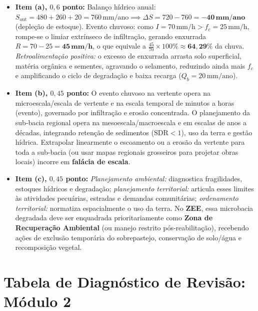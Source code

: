 \begin{boxGabarito}
  \begin{itemize}[leftmargin=1.5em, itemsep=3pt]
    \item \textbf{Item (a), $0{,}6$ ponto:}
    Balanço hídrico anual: $S_{\text{out}} = 480 + 260 + 20 = 760\,\text{mm/ano} \implies \Delta S = 720 - 760 = \mathbf{-40\,\text{mm/ano}}$ (depleção de estoque).
    Evento chuvoso: como $I = 70\,\text{mm/h} > f_c = 25\,\text{mm/h}$, rompe-se o limiar extrínseco de infiltração, gerando enxurrada $R = 70 - 25 = \mathbf{45\,\text{mm/h}}$, o que equivale a $\frac{45}{70} \times 100\% \approx \mathbf{64{,}29\%}$ da chuva.
    \emph{Retroalimentação positiva:} o excesso de enxurrada arrasta solo superficial, matéria orgânica e sementes, agravando o selamento, reduzindo ainda mais $f_c$ e amplificando o ciclo de degradação e baixa recarga ($Q_b = 20\,\text{mm/ano}$).
    \item \textbf{Item (b), $0{,}45$ ponto:}
    O evento chuvoso na vertente opera na microescala/escala de vertente e na escala temporal de minutos a horas (evento), governado por infiltração e erosão concentrada. O planejamento da sub-bacia regional opera na mesoescala/macroescala e em escalas de anos a décadas, integrando retenção de sedimentos ($\text{SDR} < 1$), uso da terra e gestão hídrica. Extrapolar linearmente o escoamento ou a erosão da vertente para toda a sub-bacia (ou usar mapas regionais grosseiros para projetar obras locais) incorre em \textbf{falácia de escala}.
    \item \textbf{Item (c), $0{,}45$ ponto:}
    \emph{Planejamento ambiental:} diagnostica fragilidades, estoques hídricos e degradação; \emph{planejamento territorial:} articula esses limites às atividades pecuárias, estradas e demandas comunitárias; \emph{ordenamento territorial:} normatiza espacialmente o uso da terra. No \textbf{ZEE}, essa microbacia degradada deve ser enquadrada prioritariamente como \textbf{Zona de Recuperação Ambiental} (ou manejo restrito pós-reabilitação), recebendo ações de exclusão temporária do sobrepastejo, conservação de solo/água e recomposição vegetal.
  \end{itemize}
\end{boxGabarito}

\section*{Tabela de Diagnóstico de Revisão: Módulo 2}

